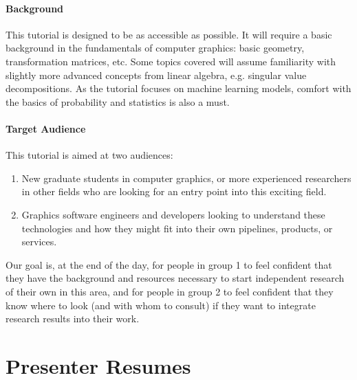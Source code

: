 \documentclass{egpubl}
\begin{document}
\paragraph*{Background}
This tutorial is designed to be as accessible as possible.
It will require a basic background in the fundamentals of computer graphics: basic geometry, transformation matrices, etc.
Some topics covered will assume familiarity with slightly more advanced concepts from linear algebra, e.g. singular value decompositions.
As the tutorial focuses on machine learning models, comfort with the basics of probability and statistics is also a must.

\paragraph*{Target Audience}
This tutorial is aimed at two audiences:
\begin{enumerate}
    \item New graduate students in computer graphics, or more experienced researchers in other fields who are looking for an entry point into this exciting field.
    \item Graphics software engineers and developers looking to understand these technologies and how they might fit into their own pipelines, products, or services.
\end{enumerate}
Our goal is, at the end of the day, for people in group 1 to feel confident that they have the background and resources necessary to start independent research of their own in this area, and for people in group 2 to feel confident that they know where to look (and with whom to consult) if they want to integrate research results into their work.

\section{Presenter Resumes}

\end{document}
